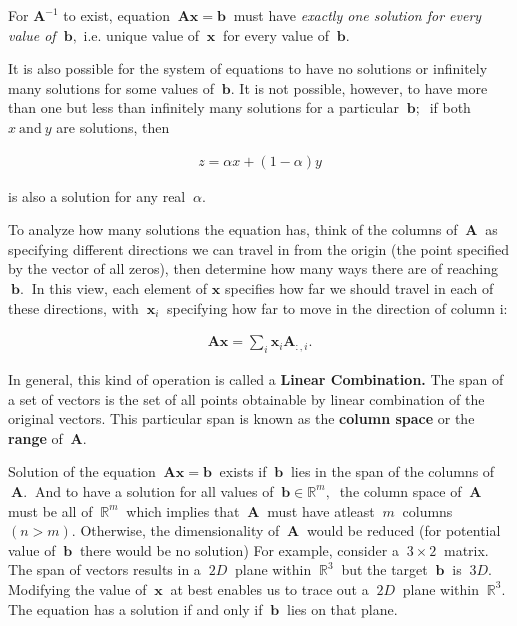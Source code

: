 \documentclass[12pt]{article}
\begin{document}
For $\mathbf{A}^{-1}$ to exist, equation $\ \mathbf{A}\mathbf{x}=\mathbf{b}\ $ must have \textit{exactly one solution for every value of $\ \mathbf{b},$} i.e. unique value of $\ \mathbf{x}\ $ for every value of $\ \mathbf{b}.$

It is also possible for the system of equations to have no solutions or infinitely many solutions for some values of $\ \mathbf{b}.$ It is not possible, however, to have more than one but less than infinitely many solutions for a particular $\ \mathbf{b};\ $ if both $x\ \text{and}\ y$ are solutions, then

\begin{align}
z = \alpha{x} + (1 −\alpha){y}
\end{align}

is also a solution for any real $\ \alpha.$

To analyze how many solutions the equation has, think of the columns of $\ \mathbf{A}\ $ as specifying different directions we can travel in from the origin (the point specified by the vector of all zeros), then determine how many ways there are of reaching $\ \mathbf{b}.\ $ In this view, each element of $\mathbf{x}$ specifies how far we should travel in each of these directions, with $\ \mathbf{x}_{i}\ $ specifying how far to move in the direction of column i:

\begin{align}
\mathbf{A}\mathbf{x}=\sum _{i}\mathbf{x}_{i}\mathbf{A}_{:,i}.
\end{align}

In general, this kind of operation is called a \textbf{Linear Combination.} The span of a set of vectors is the set of all points obtainable by linear combination of the original vectors. This particular span is known as the \textbf{column space} or the \textbf{range} of $\ \mathbf{A}.$

Solution of the equation $\ \mathbf{A}\mathbf{x}=\mathbf{b}\ $ exists if $\ \mathbf{b}\ $ lies in the span of the columns of $\ \mathbf{A}.\ $ And to have a solution for all values of $\ \mathbf{b}\in\mathbb{R}^{m},\ $ the column space of $\ \mathbf{A}\ $ must be all of $\ \mathbb{R}^{m}\ $ which implies that $\ \mathbf{A}\ $ must have atleast $\ m\ $ columns $(n>m)$.
Otherwise, the dimensionality of $\ \mathbf{A}\ $ would be reduced (for potential value of $\ \mathbf{b}\ $ there would be no solution) For example, consider a $\ 3\times 2\ $ matrix. The span of vectors results in a $\ 2D\ $ plane within $\ \mathbb{R}^{3}\ $ but the target $\ \mathbf{b}\ $ is $\ 3D.\ $
Modifying the value of $\ \mathbf{x}\ $ at best enables us to trace out a $\ 2D\ $ plane within $\ \mathbb{R}^{3}.\ $ The equation has a solution if and only if $\ \mathbf{b}\ $ lies on that plane.
\end{document}
